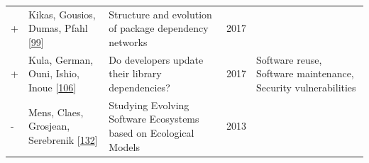 \documentclass[]{book}
\begin{document}
\begin{longtable}[]{@{}lllll@{}}
\begin{minipage}[t]{0.01\columnwidth}
+\strut
\end{minipage} & \begin{minipage}[t]{0.09\columnwidth}\raggedright\strut
Kikas, Gousios, Dumas, Pfahl
{[}\protect\hyperlink{ref-Kikas2017}{99}{]}\strut
\end{minipage} & \begin{minipage}[t]{0.34\columnwidth}\raggedright\strut
Structure and evolution of package dependency networks\strut
\end{minipage} & \begin{minipage}[t]{0.02\columnwidth}\raggedright\strut
2017\strut
\end{minipage} & \begin{minipage}[t]{0.39\columnwidth}\raggedright\strut
\strut
\end{minipage}\tabularnewline
\begin{minipage}[t]{0.01\columnwidth}\raggedright\strut
+\strut
\end{minipage} & \begin{minipage}[t]{0.09\columnwidth}\raggedright\strut
Kula, German, Ouni, Ishio, Inoue
{[}\protect\hyperlink{ref-Kula2017}{106}{]}\strut
\end{minipage} & \begin{minipage}[t]{0.34\columnwidth}\raggedright\strut
Do developers update their library dependencies?\strut
\end{minipage} & \begin{minipage}[t]{0.02\columnwidth}\raggedright\strut
2017\strut
\end{minipage} & \begin{minipage}[t]{0.39\columnwidth}\raggedright\strut
Software reuse, Software maintenance, Security vulnerabilities\strut
\end{minipage}\tabularnewline
\begin{minipage}[t]{0.01\columnwidth}\raggedright\strut
-\strut
\end{minipage} & \begin{minipage}[t]{0.09\columnwidth}\raggedright\strut
Mens, Claes, Grosjean, Serebrenik
{[}\protect\hyperlink{ref-Mens2013}{132}{]}\strut
\end{minipage} & \begin{minipage}[t]{0.34\columnwidth}\raggedright\strut
Studying Evolving Software Ecosystems based on Ecological Models\strut
\end{minipage} & \begin{minipage}[t]{0.02\columnwidth}\raggedright\strut
2013\strut
\end{minipage} & \begin{minipage}[t]{0.39\columnwidth}\raggedright\strut

\end{minipage}
\end{longtable}
\end{document}
